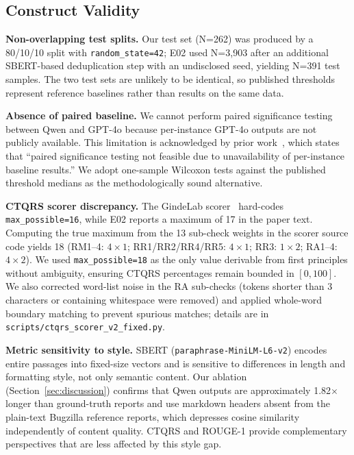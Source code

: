 \subsection{Construct Validity}

\textbf{Non-overlapping test splits.}
Our test set (N=262) was produced by a 80/10/10 split with
\texttt{random\_state=42}; E02 used N=3,903 after an additional
SBERT-based deduplication step with an undisclosed seed,
yielding N=391 test samples. The two test sets are unlikely to be
identical, so published thresholds represent reference baselines
rather than results on the same data.

\textbf{Absence of paired baseline.}
We cannot perform paired significance testing between Qwen and
GPT-4o because per-instance GPT-4o outputs are not publicly
available. This limitation is acknowledged by prior
work~\cite{choi2025agentreport}, which states that
``paired significance testing not feasible due to unavailability
of per-instance baseline results.'' We adopt one-sample
Wilcoxon tests against the published threshold medians as
the methodologically sound alternative.

\textbf{CTQRS scorer discrepancy.}
The GindeLab scorer~\cite{acharya2025bugquality} hard-codes
\texttt{max\_possible=16}, while E02 reports a maximum of 17 in
the paper text. Computing the true maximum from the 13
sub-check weights in the scorer source code yields 18 (RM1--4:
$4\times1$; RR1/RR2/RR4/RR5: $4\times1$; RR3: $1\times2$;
RA1--4: $4\times2$). We used \texttt{max\_possible=18} as the
only value derivable from first principles without ambiguity,
ensuring CTQRS percentages remain bounded in $[0, 100]$.
We also corrected word-list noise in the RA sub-checks
(tokens shorter than 3 characters or containing whitespace
were removed) and applied whole-word boundary matching
to prevent spurious matches; details are in
\texttt{scripts/ctqrs\_scorer\_v2\_fixed.py}.

\textbf{Metric sensitivity to style.}
SBERT (\texttt{paraphrase-MiniLM-L6-v2}) encodes entire
passages into fixed-size vectors and is sensitive to differences
in length and formatting style, not only semantic content.
Our ablation (Section~\ref{sec:discussion}) confirms that
Qwen outputs are approximately 1.82$\times$ longer than
ground-truth reports and use markdown headers absent
from the plain-text Bugzilla reference reports, which
depresses cosine similarity independently of content quality.
CTQRS and ROUGE-1 provide complementary perspectives
that are less affected by this style gap.

